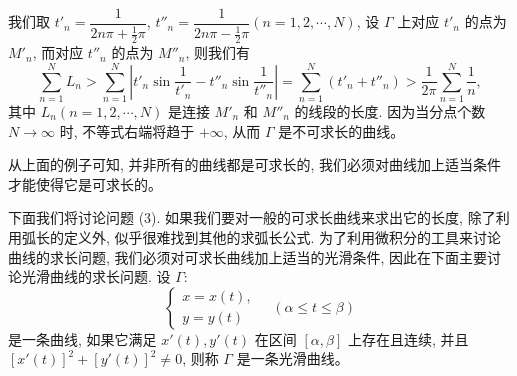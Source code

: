 \documentclass[UTF8,12pt,a4paper,fontset=fandol]{ctexart}
\begin{document}
我们取 $t'_n=\dfrac{1}{2n\pi+\frac12\pi}$, $t''_n=\dfrac{1}{2n\pi-\frac12\pi}(n=1,2,\cdots,N)$, 设 $\Gamma$ 上对应 $t'_n$ 的点为 $M'_n$, 而对应 $t''_n$ 的点为 $M''_n$, 则我们有
\[
  \sum_{n=1}^N L_n
  >\sum_{n=1}^N\left|t'_n\sin\frac{1}{t'_n}-t''_n\sin\frac{1}{t''_n}\right|
  =\sum_{n=1}^N(t'_n+t''_n)>\frac{1}{2\pi}\sum_{n=1}^N\frac{1}{n},
\]
其中 $L_n(n=1,2,\cdots,N)$ 是连接 $M'_n$ 和 $M''_n$ 的线段的长度. 因为当分点个数 $N\to\infty$ 时, 不等式右端将趋于 $+\infty$, 从而 $\Gamma$ 是不可求长的曲线。

从上面的例子可知, 并非所有的曲线都是可求长的, 我们必须对曲线加上适当条件才能使得它是可求长的。

下面我们将讨论问题 (3). 如果我们要对一般的可求长曲线来求出它的长度, 除了利用弧长的定义外, 似乎很难找到其他的求弧长公式. 为了利用微积分的工具来讨论曲线的求长问题, 我们必须对可求长曲线加上适当的光滑条件, 因此在下面主要讨论光滑曲线的求长问题. 设 $\Gamma$:
\[
  \begin{cases}
    x=x(t),\\
    y=y(t)
  \end{cases}
  \quad(\alpha\leq t\leq\beta)
\]
是一条曲线, 如果它满足 $x'(t),y'(t)$ 在区间 $[\alpha,\beta]$ 上存在且连续, 并且 $[x'(t)]^2+[y'(t)]^2\neq0$, 则称 $\Gamma$ 是一条光滑曲线。
\end{document}
